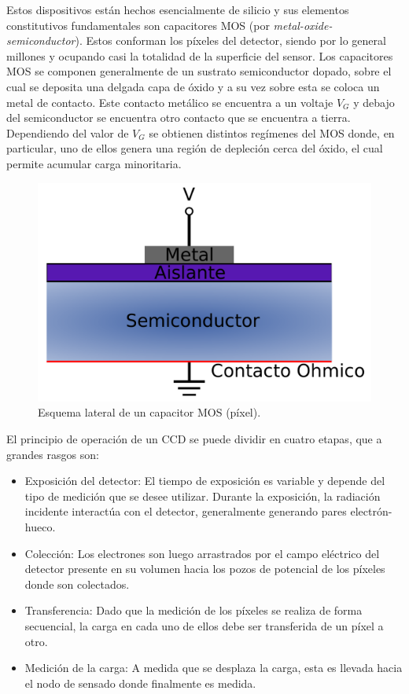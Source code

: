 Estos dispositivos están hechos esencialmente de silicio y sus elementos constitutivos fundamentales son capacitores MOS (por \textit{metal-oxide-semiconductor}). Estos conforman los píxeles del detector, siendo por lo general millones y ocupando casi la totalidad de la superficie del sensor. Los capacitores MOS se componen generalmente de un sustrato semiconductor dopado, sobre el cual se deposita una delgada capa de óxido y a su vez sobre esta se coloca un metal de contacto. Este contacto metálico se encuentra a un voltaje $V_{G}$ y debajo del semiconductor se encuentra otro contacto que se encuentra a tierra. Dependiendo del valor de $V_{G}$ se obtienen distintos regímenes del MOS\cite{Chenming} donde, en particular, uno de ellos genera una región de depleción cerca del óxido, el cual permite acumular carga minoritaria.
\begin{figure}%
    \centering
        \includegraphics[scale=.35]{Figs/PixelCrossSection.pdf}
    \caption{\footnotesize{Esquema lateral de un capacitor MOS (píxel).}}
    \label{fig:PixelCrossSection}
\end{figure}
El principio de operación de un CCD se puede dividir en cuatro etapas, que a grandes rasgos son:
\begin{itemize}
    \item Exposición del detector: El tiempo de exposición es variable y depende del tipo de medición que se desee utilizar. Durante la exposición, la radiación incidente interactúa con el detector, generalmente generando pares electrón-hueco. 
    \item Colección: Los electrones son luego arrastrados por el campo eléctrico del detector presente en su volumen hacia los pozos de potencial de los píxeles donde son colectados.
    \item Transferencia: Dado que la medición de los píxeles se realiza de forma secuencial, la carga en cada uno de ellos debe ser transferida de un píxel a otro.
    \item Medición de la carga: A medida que se desplaza la carga, esta es llevada hacia el nodo de sensado donde finalmente es medida.
\end{itemize}
